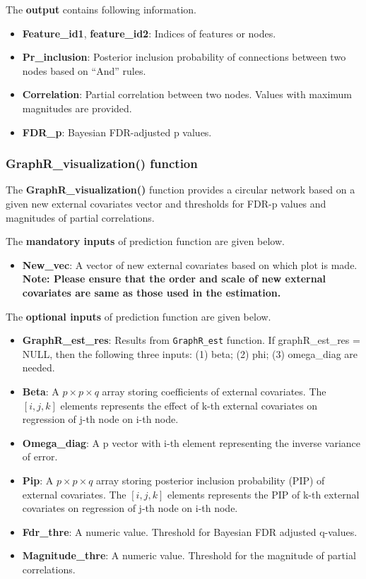 \documentclass[
]{article}
\providecommand{\tightlist}{%
  \setlength{\itemsep}{0pt}\setlength{\parskip}{0pt}}
\begin{document}
The \textbf{output} contains following information.

\begin{itemize}
\item
  \textbf{Feature\_id1}, \textbf{feature\_id2}: Indices of features or
  nodes.
\item
  \textbf{Pr\_inclusion}: Posterior inclusion probability of connections
  between two nodes based on ``And'' rules.
\item
  \textbf{Correlation}: Partial correlation between two nodes. Values
  with maximum magnitudes are provided.
\item
  \textbf{FDR\_p}: Bayesian FDR-adjusted p values.
\end{itemize}

\hypertarget{graphr_visualization-function}{%
\subsubsection{GraphR\_visualization()
function}\label{graphr_visualization-function}}

The \textbf{GraphR\_visualization()} function provides a circular
network based on a given new external covariates vector and thresholds
for FDR-p values and magnitudes of partial correlations.

The \textbf{mandatory inputs} of prediction function are given below.

\begin{itemize}
\tightlist
\item
  \textbf{New\_vec}: A vector of new external covariates based on which
  plot is made. \textbf{Note: Please ensure that the order and scale of
  new external covariates are same as those used in the estimation.}
\end{itemize}

The \textbf{optional inputs} of prediction function are given below.

\begin{itemize}
\item
  \textbf{GraphR\_est\_res}: Results from \texttt{GraphR\_est} function.
  If graphR\_est\_res = NULL, then the following three inputs: (1) beta;
  (2) phi; (3) omega\_diag are needed.
\item
  \textbf{Beta}: A \(p \times p \times q\) array storing coefficients of
  external covariates. The \([i,j,k]\) elements represents the effect of
  k-th external covariates on regression of j-th node on i-th node.
\item
  \textbf{Omega\_diag}: A p vector with i-th element representing the
  inverse variance of error.
\item
  \textbf{Pip}: A \(p \times p \times q\) array storing posterior
  inclusion probability (PIP) of external covariates. The \([i,j,k]\)
  elements represents the PIP of k-th external covariates on regression
  of j-th node on i-th node.
\item
  \textbf{Fdr\_thre}: A numeric value. Threshold for Bayesian FDR
  adjusted q-values.
\item
  \textbf{Magnitude\_thre}: A numeric value. Threshold for the magnitude
  of partial correlations.
\end{itemize}
\end{document}
